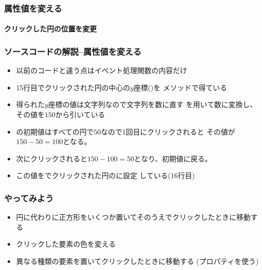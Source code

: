 \begin{frame}[containsverbatim]
 \frametitle{属性値を変える}
 \framesubtitle{クリックした円の位置を変更}
\end{frame}
\begin{frame}[containsverbatim]
 \frametitle{ソースコードの解説--属性値を変える}
 \begin{itemize}
  \item 以前のコードと違う点はイベント処理関数の内容だけ
  \item 15行目でクリックされた円の中心の$y$座標()を
        メソッドで得ている
  \item 得られた$y$座標の値は文字列なので文字列を数に直す
        を用いて数に変換し、その値を$150$から引いている
  \item {}の初期値はすべての円で$50$なので1回目にクリックされると
        その値が$150-50=100$となる。
  \item 次にクリックされると$150-100=50$となり、初期値に戻る。
  \item この値をでクリックされた円のに設定
        している(16行目)
 \end{itemize}
\end{frame}
 \begin{frame}[containsverbatim]
  \frametitle{やってみよう}
  \begin{itemize}
   \item 円に代わりに正方形をいくつか置いてそのうえでクリックしたときに移動する
   \item クリックした要素の色を変える
   \item 異なる種類の要素を置いてクリックしたときに移動する
         (プロパティを使う)
  \end{itemize}
 
\end{frame}

\begin{frame}[containsverbatim]
 \frametitle{}
\end{frame}
